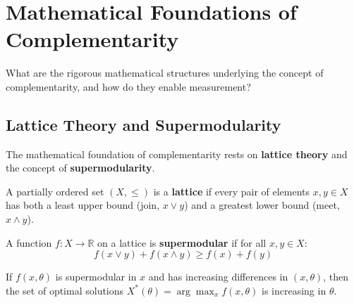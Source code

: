\section{Mathematical Foundations of Complementarity}
\label{sec:comp-math-foundations}

\begin{tcolorbox}[colback=blue!5!white,colframe=blue!75!black,title=\textbf{Fundamental Question}]
What are the rigorous mathematical structures underlying the concept of complementarity, and how do they enable measurement?
\end{tcolorbox}

\subsection{Lattice Theory and Supermodularity}
\label{subsec:lattice-theory}

The mathematical foundation of complementarity rests on \textbf{lattice theory} and the concept of \textbf{supermodularity}.

\begin{definition}[Lattice]
A partially ordered set $(X, \leq)$ is a \textbf{lattice} if every pair of elements $x, y \in X$ has both a least upper bound (join, $x \vee y$) and a greatest lower bound (meet, $x \wedge y$).
\end{definition}

\begin{definition}[Supermodularity]
A function $f: X \to \mathbb{R}$ on a lattice is \textbf{supermodular} if for all $x, y \in X$:
\begin{equation}
f(x \vee y) + f(x \wedge y) \geq f(x) + f(y)
\label{eq:supermodularity}
\end{equation}
\end{definition}

\begin{theorem}[Topkis, 1978]
\label{thm:topkis}
If $f(x, \theta)$ is supermodular in $x$ and has increasing differences in $(x, \theta)$, then the set of optimal solutions $X^*(\theta) = \arg\max_x f(x, \theta)$ is increasing in $\theta$.
\end{theorem}

